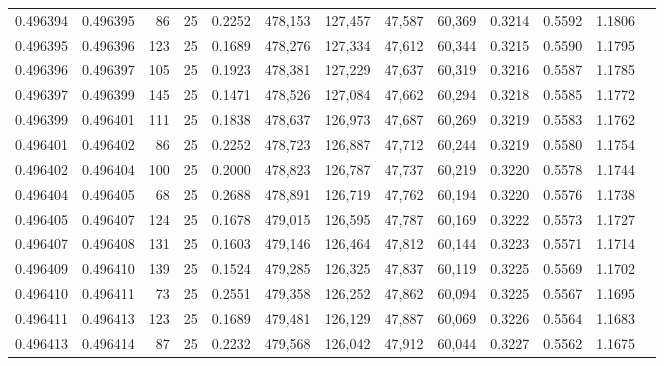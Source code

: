 \begin{tabular}{rrrrrrrrrrrrr}
0.496394 & 0.496395 &    86 &  25 &                                     0.2252 & 478,153 & 127,457 &  47,587 &  60,369 & 0.3214 & 0.5592 & 1.1806 \\
0.496395 & 0.496396 &   123 &  25 &                                     0.1689 & 478,276 & 127,334 &  47,612 &  60,344 & 0.3215 & 0.5590 & 1.1795 \\
0.496396 & 0.496397 &   105 &  25 &                                     0.1923 & 478,381 & 127,229 &  47,637 &  60,319 & 0.3216 & 0.5587 & 1.1785 \\
0.496397 & 0.496399 &   145 &  25 &                                     0.1471 & 478,526 & 127,084 &  47,662 &  60,294 & 0.3218 & 0.5585 & 1.1772 \\
0.496399 & 0.496401 &   111 &  25 &                                     0.1838 & 478,637 & 126,973 &  47,687 &  60,269 & 0.3219 & 0.5583 & 1.1762 \\
0.496401 & 0.496402 &    86 &  25 &                                     0.2252 & 478,723 & 126,887 &  47,712 &  60,244 & 0.3219 & 0.5580 & 1.1754 \\
0.496402 & 0.496404 &   100 &  25 &                                     0.2000 & 478,823 & 126,787 &  47,737 &  60,219 & 0.3220 & 0.5578 & 1.1744 \\
0.496404 & 0.496405 &    68 &  25 &                                     0.2688 & 478,891 & 126,719 &  47,762 &  60,194 & 0.3220 & 0.5576 & 1.1738 \\
0.496405 & 0.496407 &   124 &  25 &                                     0.1678 & 479,015 & 126,595 &  47,787 &  60,169 & 0.3222 & 0.5573 & 1.1727 \\
0.496407 & 0.496408 &   131 &  25 &                                     0.1603 & 479,146 & 126,464 &  47,812 &  60,144 & 0.3223 & 0.5571 & 1.1714 \\
0.496409 & 0.496410 &   139 &  25 &                                     0.1524 & 479,285 & 126,325 &  47,837 &  60,119 & 0.3225 & 0.5569 & 1.1702 \\
0.496410 & 0.496411 &    73 &  25 &                                     0.2551 & 479,358 & 126,252 &  47,862 &  60,094 & 0.3225 & 0.5567 & 1.1695 \\
0.496411 & 0.496413 &   123 &  25 &                                     0.1689 & 479,481 & 126,129 &  47,887 &  60,069 & 0.3226 & 0.5564 & 1.1683 \\
0.496413 & 0.496414 &    87 &  25 &                                     0.2232 & 479,568 & 126,042 &  47,912 &  60,044 & 0.3227 & 0.5562 & 1.1675 \\

\end{tabular}
